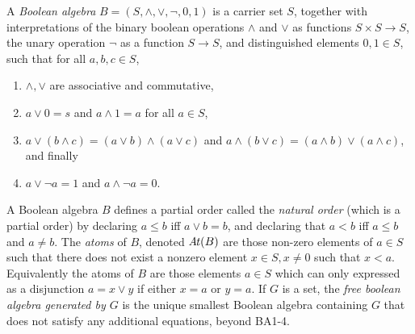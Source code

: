 \documentclass{article}
\begin{document}
    \begin{defn}
        A \emph{Boolean algebra} $B = (S, \land,\lor,\lnot,0,1)$ is a carrier set $S$, together with interpretations of the binary boolean operations $\land $ and $\lor$ as functions $S\times S \to S$, the unary operation $\lnot$ as a function $S \to S$, and distinguished elements $0, 1 \in S$, such that for all $a, b, c \in S$,
        \begin{enumerate}[itemsep=0pt, parsep=1pt,label={BA\arabic*.}]
            \item $\land, \lor$ are associative and commutative,
            \item $a \lor 0 = s$ and $a \land 1 = a$ for all $a \in S$,
            \item $a \lor(b \land c) = (a \lor b) \land (a \lor c)$ and $a \land(b \lor c) = (a \land b) \lor (a \land c)$,  and finally
            \item $a \lor \lnot a = 1$ and $a \land \lnot a = 0$.
        \end{enumerate}
        A Boolean algebra $B$ defines a partial order called the \emph{natural order} (which is a partial order) by declaring $a \leq b$ iff $a \lor b = b$, and declaring that $a < b$ iff $a \leq b$ and $a \neq b$.
        The \emph{atoms} of $B$, denoted $\mathit{A\mkern-2mu t}(B)$ are those non-zero elements of $a \in S$ such that there does not exist a nonzero element $x \in S, x \ne 0$ such that $x < a$. Equivalently the atoms of $B$ are those elements $a\in S$ which can only expressed as a disjunction $a = x \lor y$ if either $x = a$ or $y=a$.
        If $G$ is a set, the \emph{free boolean algebra generated by $G$} is the unique smallest Boolean algebra containing $G$ that does not satisfy any additional equations, beyond {BA1-4}.
    \end{defn}
\end{document}
